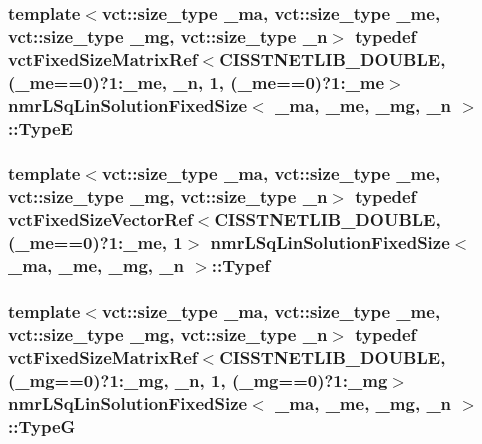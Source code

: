 \subsubsection[{Type\+E}]{\setlength{\rightskip}{0pt plus 5cm}template$<$vct\+::size\+\_\+type \+\_\+ma, vct\+::size\+\_\+type \+\_\+me, vct\+::size\+\_\+type \+\_\+mg, vct\+::size\+\_\+type \+\_\+n$>$ typedef {\bf vct\+Fixed\+Size\+Matrix\+Ref}$<$C\+I\+S\+S\+T\+N\+E\+T\+L\+I\+B\+\_\+\+D\+O\+U\+B\+L\+E, (\+\_\+me==0)?1\+:\+\_\+me, \+\_\+n, 1, (\+\_\+me==0)?1\+:\+\_\+me$>$ {\bf nmr\+L\+Sq\+Lin\+Solution\+Fixed\+Size}$<$ \+\_\+ma, \+\_\+me, \+\_\+mg, \+\_\+n $>$\+::{\bf Type\+E}}\label{classnmr_l_sq_lin_solution_fixed_size_a74ac0c633236e0b04e8969f7fbfc92a6}
\hypertarget{classnmr_l_sq_lin_solution_fixed_size_ada2bec63c68d10997259c4c0fff5a085}{}
\subsubsection[{Typef}]{\setlength{\rightskip}{0pt plus 5cm}template$<$vct\+::size\+\_\+type \+\_\+ma, vct\+::size\+\_\+type \+\_\+me, vct\+::size\+\_\+type \+\_\+mg, vct\+::size\+\_\+type \+\_\+n$>$ typedef {\bf vct\+Fixed\+Size\+Vector\+Ref}$<$C\+I\+S\+S\+T\+N\+E\+T\+L\+I\+B\+\_\+\+D\+O\+U\+B\+L\+E, (\+\_\+me==0)?1\+:\+\_\+me, 1$>$ {\bf nmr\+L\+Sq\+Lin\+Solution\+Fixed\+Size}$<$ \+\_\+ma, \+\_\+me, \+\_\+mg, \+\_\+n $>$\+::{\bf Typef}}\label{classnmr_l_sq_lin_solution_fixed_size_ada2bec63c68d10997259c4c0fff5a085}
\hypertarget{classnmr_l_sq_lin_solution_fixed_size_a043640ee3f0a5a11b4b6972ddd9c8b90}{}
\subsubsection[{Type\+G}]{\setlength{\rightskip}{0pt plus 5cm}template$<$vct\+::size\+\_\+type \+\_\+ma, vct\+::size\+\_\+type \+\_\+me, vct\+::size\+\_\+type \+\_\+mg, vct\+::size\+\_\+type \+\_\+n$>$ typedef {\bf vct\+Fixed\+Size\+Matrix\+Ref}$<$C\+I\+S\+S\+T\+N\+E\+T\+L\+I\+B\+\_\+\+D\+O\+U\+B\+L\+E, (\+\_\+mg==0)?1\+:\+\_\+mg, \+\_\+n, 1, (\+\_\+mg==0)?1\+:\+\_\+mg$>$ {\bf nmr\+L\+Sq\+Lin\+Solution\+Fixed\+Size}$<$ \+\_\+ma, \+\_\+me, \+\_\+mg, \+\_\+n $>$\+::{\bf Type\+G}}\label{classnmr_l_sq_lin_solution_fixed_size_a043640ee3f0a5a11b4b6972ddd9c8b90}
\hypertarget{classnmr_l_sq_lin_solution_fixed_size_aa86f02bad0142d8bccac845d426bb153}{}
